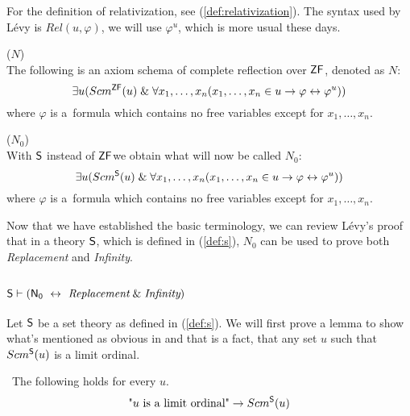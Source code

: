 For the definition of relativization, see (\ref{def:relativization}). The syntax used by Lévy is $Rel(u, \varphi)$, we will use $\varphi^{u}$, which is more usual these days.
\begin{definition}{($N$)}\label{def:levy_axiom_n}\\
The following is an axiom schema of complete reflection over $\sf{ZF}$, denoted as $N$:
\begin{equation}
\exists u (Scm^{\sf{ZF}}(u) \mathrel{\&} \forall x_1, \ldots , x_n (x_1, \ldots , x_n \in u \rightarrow \varphi \leftrightarrow \varphi^{u}))
\end{equation}
where $\varphi$ is a~formula which contains no free variables except for $x_1, \ldots , x_n$.
\end{definition}

\begin{definition}{($N_0$)}\label{def:levy_axiom_n0}\\
With $\sf{S}$ instead of $\sf{ZF}$we obtain what will now be called $N_0$:
\begin{equation}
\exists u (Scm^{\sf{S}}(u) \mathrel{\&} \forall x_1, \ldots , x_n (x_1, \ldots , x_n \in u \rightarrow \varphi \leftrightarrow \varphi^{u}))
\end{equation}
where $\varphi$ is a~formula which contains no free variables except for $x_1, \ldots , x_n$.
\end{definition}

Now that we have established the basic terminology, we can review Lévy's proof that in a theory $\sf{S}$, which is defined in (\ref{def:s}), $N_0$ can be used to prove both \emph{Replacement} and \emph{Infinity}.

\subsection{$\sf{S} \vdash (N_0\ \leftrightarrow\ \emph{Replacement} \mathrel{\&} \emph{Infinity})$} 
Let $\sf{S}$ be a set theory as defined in (\ref{def:s}). We will first prove a lemma to show what's mentioned as obvious in \cite{Levy60a} and that is a fact, that any set $u$ such that $Scm^{\sf{S}}(u)$ is a limit ordinal.
\begin{lemma}\label{lemma:scm_s_is_limit}\
The following holds for every $u$.
\begin{equation}
\mbox{"$u$ is a limit ordinal"} \then Scm^{\sf{S}}(u) %
\end{equation}
\end{lemma}

